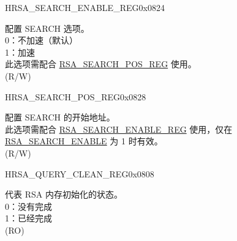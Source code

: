 \begin{register}{H}{RSA\_SEARCH\_ENABLE\_REG}{0x0824}\label{regdesc:RSASEARCHENABLEREG}
%
%
\regnewline%
\begin{regdesc}\begin{reglist}
\label{fielddesc:RSASEARCHENABLE}\item [RSA\_SEARCH\_ENABLE] 配置 SEARCH 选项。\\
0：不加速（默认）\\
1：加速\\
此选项需配合 \hyperref[regdesc:RSASEARCHPOSREG]{RSA\_SEARCH\_POS\_REG} 使用。\\
(R/W)
\end{reglist}\end{regdesc}
\end{register}


\begin{register}{H}{RSA\_SEARCH\_POS\_REG}{0x0828}\label{regdesc:RSASEARCHPOSREG}
%
%
\regnewline%
\begin{regdesc}\begin{reglist}
\label{fielddesc:RSASEARCHPOS}\item [RSA\_SEARCH\_POS] 配置 SEARCH 的开始地址。\\
此选项需配合 \hyperref[regdesc:RSASEARCHENABLEREG]{RSA\_SEARCH\_ENABLE\_REG} 使用，仅在 \hyperref[fielddesc:RSASEARCHENABLE]{RSA\_SEARCH\_ENABLE} 为 1 时有效。\\
(R/W)
\end{reglist}\end{regdesc}
\end{register}


\begin{register}{H}{RSA\_QUERY\_CLEAN\_REG}{0x0808}\label{regdesc:RSAQUERYCLEANREG}
%
%
\regnewline%
\begin{regdesc}\begin{reglist}
\label{fielddesc:RSAQUERYCLEAN}\item [RSA\_QUERY\_CLEAN]代表 RSA 内存初始化的状态。\\
0：没有完成\\
1：已经完成\\
(RO)
\end{reglist}\end{regdesc}
\end{register}


